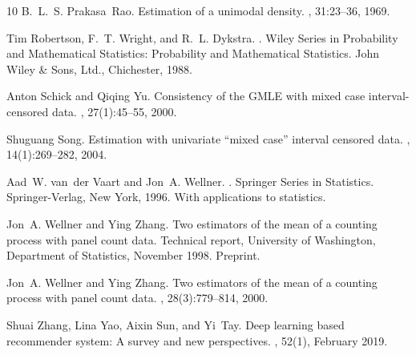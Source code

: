 \documentclass[12pt]{amsart}
\theoremstyle{plain}
\theoremstyle{remark}
\numberwithin{equation}{section}
\begin{document}
\begin{thebibliography}{10}
B.~L.~S. Prakasa~Rao.
\newblock Estimation of a unimodal density.
, 31:23--36, 1969.

Tim Robertson, F.~T. Wright, and R.~L. Dykstra.
.
\newblock Wiley Series in Probability and Mathematical Statistics: Probability and Mathematical Statistics. John Wiley \& Sons, Ltd., Chichester, 1988.

Anton Schick and Qiqing Yu.
\newblock Consistency of the {GMLE} with mixed case interval-censored data.
, 27(1):45--55, 2000.

Shuguang Song.
\newblock Estimation with univariate ``mixed case'' interval censored data.
, 14(1):269--282, 2004.

Aad~W. van~der Vaart and Jon~A. Wellner.
.
\newblock Springer Series in Statistics. Springer-Verlag, New York, 1996.
\newblock With applications to statistics.

Jon~A. Wellner and Ying Zhang.
\newblock Two estimators of the mean of a counting process with panel count data.
\newblock Technical report, University of Washington, Department of Statistics, November 1998.
\newblock Preprint.

Jon~A. Wellner and Ying Zhang.
\newblock Two estimators of the mean of a counting process with panel count data.
, 28(3):779--814, 2000.

Shuai Zhang, Lina Yao, Aixin Sun, and Yi~Tay.
\newblock Deep learning based recommender system: A survey and new perspectives.
, 52(1), February 2019.

\end{thebibliography}
\end{document}
